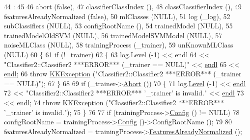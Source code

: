 \begin{DoxyCode}
44                           :
45 
46   abort                     (\textcolor{keyword}{false}),
47   classifierClassIndex      (),
48   classClassifierIndex      (),
49   featuresAlreadyNormalized (\textcolor{keyword}{false}),
50   mlClasses                 (NULL),
51   log                       (\_log),
52   subClassifiers            (NULL),
53   configRootName            (),
54   trainedModel              (NULL),
55   trainedModelOldSVM        (NULL),
56   trainedModelSVMModel      (NULL),
57   noiseMLClass              (NULL),
58   trainingProcess           (\_trainer),
59   unKnownMLClass            (NULL)
60 \{
61   \textcolor{keywordflow}{if}  (!\_trainer)
62   \{
63     log.\hyperlink{class_k_k_b_1_1_run_log_a32cf761d7f2e747465fd80533fdbb659}{Level} (-1) << \hyperlink{namespace_k_k_b_ad1f50f65af6adc8fa9e6f62d007818a8}{endl}
64       << \textcolor{stringliteral}{"Classifier2::Classifier2    ***ERROR***     (\_trainer == NULL)"} << 
      \hyperlink{namespace_k_k_b_ad1f50f65af6adc8fa9e6f62d007818a8}{endl}
65       << \hyperlink{namespace_k_k_b_ad1f50f65af6adc8fa9e6f62d007818a8}{endl};
66     \textcolor{keywordflow}{throw} \hyperlink{class_k_k_b_1_1_k_k_exception}{KKException} (\textcolor{stringliteral}{"Classifier2::Classifier2    ***ERROR***     (\_trainer == NULL)"});
67   \}
68 
69   \textcolor{keywordflow}{if}  (\_trainer->\hyperlink{class_k_k_m_l_l_1_1_training_process2_a11725f4aac3b45c7a070bc78aa406724}{Abort} ())
70   \{
71     log.\hyperlink{class_k_k_b_1_1_run_log_a32cf761d7f2e747465fd80533fdbb659}{Level} (-1) << \hyperlink{namespace_k_k_b_ad1f50f65af6adc8fa9e6f62d007818a8}{endl}
72       << \textcolor{stringliteral}{"Classifier2::Classifier2    ***ERROR***     '\_trainer' is invalid."} << 
      \hyperlink{namespace_k_k_b_ad1f50f65af6adc8fa9e6f62d007818a8}{endl}
73       << \hyperlink{namespace_k_k_b_ad1f50f65af6adc8fa9e6f62d007818a8}{endl};
74     \textcolor{keywordflow}{throw} \hyperlink{class_k_k_b_1_1_k_k_exception}{KKException} (\textcolor{stringliteral}{"Classifier2::Classifier2    ***ERROR***     '\_trainer' is invalid."});
75   \}
76 
77   \textcolor{keywordflow}{if}  (trainingProcess->\hyperlink{class_k_k_m_l_l_1_1_training_process2_a1c03795f43796bf2090bb0e8b2fd81db}{Config} () != NULL)
78     configRootName = trainingProcess->\hyperlink{class_k_k_m_l_l_1_1_training_process2_a1c03795f43796bf2090bb0e8b2fd81db}{Config} ()->ConfigRootName ();
79 
80   featuresAlreadyNormalized = trainingProcess->\hyperlink{class_k_k_m_l_l_1_1_training_process2_a258a13bc5acfd8f6b0eb5444ba8eef97}{FeaturesAlreadyNormalized} ();

\end{DoxyCode}

